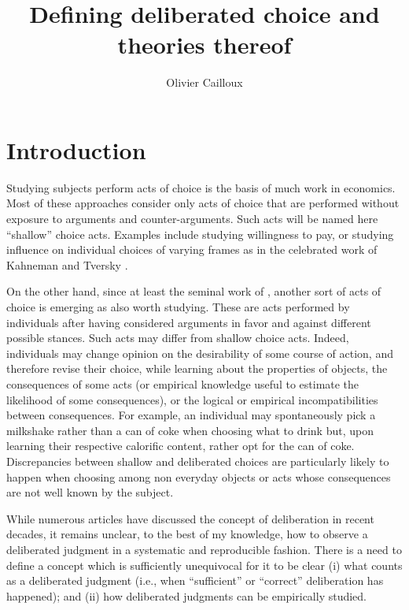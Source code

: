 \documentclass[version=last, pagesize, twoside=off, bibliography=totoc, DIV=calc, fontsize=12pt, a4paper, french, english]{scrartcl}
\begin{document}
\title{Defining deliberated choice and theories thereof}
\author{Olivier Cailloux}
\makeatletter
{}
\makeatother
\maketitle

\section{Introduction}
Studying subjects perform acts of choice is the basis of much work in economics.
Most of these approaches consider only acts of choice that are performed without exposure to arguments and counter-arguments. Such acts will be named here “shallow” choice acts. 
Examples include studying willingness to pay, or studying influence on individual choices of varying frames as in the celebrated work of Kahneman and Tversky \citep{bell_descriptive_1988, kahneman_thinking_2012}.

On the other hand, since at least the seminal work of \citet{fishkin_when_2011}, another sort of acts of choice is emerging as also worth studying.
These are acts performed by individuals 
after having considered arguments in favor and against different possible stances. 
Such acts may differ from shallow choice acts. 
Indeed, individuals may change opinion on the desirability of some course of action, and therefore revise their choice, while learning about the properties of objects, the consequences of some acts (or empirical knowledge useful to estimate the likelihood of some consequences), or the logical or empirical incompatibilities between consequences. 
For example, an individual may spontaneously pick a milkshake rather than a can of coke when choosing what to drink but, upon learning their respective calorific content, rather opt for the can of coke.
Discrepancies between shallow and deliberated choices are particularly likely to happen when choosing among non everyday objects or acts whose consequences are not well known by the subject. 

While numerous articles have discussed the concept of deliberation in recent decades, it remains unclear, to the best of my knowledge, how to observe a deliberated judgment in a systematic and reproducible fashion. 
There is a need to define a concept which is sufficiently unequivocal for it to be clear 
(i) what counts as a deliberated judgment (i.e., when “sufficient” \citep{meinard_justification_2020} or “correct” deliberation has happened); 
and (ii) how deliberated judgments can be empirically studied.
\end{document}
